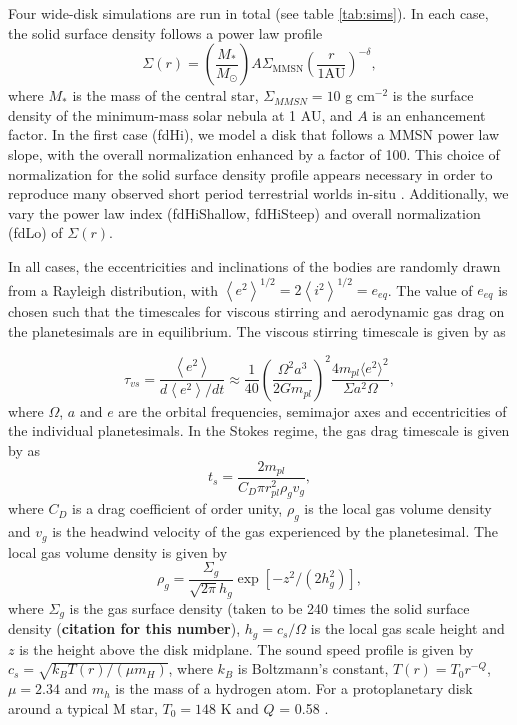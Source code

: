 \documentclass[twocolumn]{aastex63}
\begin{document}
Four wide-disk simulations are run in total (see table \ref{tab:sims}). In each case, the solid surface density follows a power law profile
\begin{equation}
	\Sigma(r) = \left( \frac{M_{*}}{M_{\odot}} \right) A \Sigma_{\mathrm{MMSN}} \left( \frac{r}{1 \mathrm{AU}} \right)^{-\delta},
\end{equation}
where $M_{*}$ is the mass of the central star, $\Sigma_{MMSN} = 10$ g
cm$^{-2}$ is the surface density of the minimum-mass solar nebula
\citep{hayashi81} at 1 AU, and $A$ is an enhancement factor.
In the first case (fdHi), we model a disk that follows a MMSN power law slope, with the overall normalization enhanced by a factor of 100. This choice of normalization for the solid surface density profile appears necessary in order to reproduce many observed short period terrestrial worlds in-situ \citep{hansen12}. Additionally, we vary the power law index (fdHiShallow, fdHiSteep) and overall normalization (fdLo) of $\Sigma(r)$.

In all cases, the eccentricities and inclinations of the bodies are randomly drawn from a Rayleigh distribution, with $\left< e^{2} \right>^{1/2} = 2\left<i^{2} \right>^{1/2} = e_{eq}$. The value of $e_{eq}$ is chosen such that the timescales for viscous stirring and aerodynamic gas drag on the planetesimals are in equilibrium. The viscous stirring timescale is given by \citet{ida93} as

\begin{equation}\label{eq:vs_timescale}
    \tau_{vs}  = \frac{\left< e^2 \right>}{d \left< e^2 \right> / dt} \approx \frac{1}{40}\left(\frac{\Omega^{2} a^{3}}{2 G m_{pl}}\right)^{2} \frac{4 m_{pl} \langle e^{2} \rangle^{2}}{\Sigma a^{2} \Omega},
\end{equation}
where $\Omega$, $a$ and $e$ are the orbital frequencies, semimajor axes and eccentricities of the individual planetesimals. In the Stokes regime, the gas drag timescale is given by \citet{adachi76} as
\begin{equation}\label{eq:ts_stokes}
    t_{s} = \frac{2 m_{pl}}{C_{D} \pi r_{pl}^{2} \rho_{g} v_{g}},
\end{equation}
where $C_{D}$ is a drag coefficient of order unity, $\rho_{g}$ is the local gas volume density and $v_{g}$ is the headwind velocity of the gas experienced by the planetesimal. The local gas volume density is given by
\begin{equation}\label{eq:rho_gas}
	\rho_{g} = \frac{\Sigma_{g}}{\sqrt{2 \pi} h_{g}} \exp\left[ -z^{2} / \left( 2 h_{g}^{2} \right) \right],
\end{equation}
where $\Sigma_{g}$ is the gas surface density (taken to be
240 times the solid surface density ({\bf citation for this number}), $h_{g} = c_{s} / \Omega$ is the local gas scale height and $z$ is the height above the disk midplane. The sound speed profile is given by $c_{s} = \sqrt{k_{B} T(r) / \left( \mu m_{H} \right)}$, where $k_{B}$ is Boltzmann's constant, $T(r) = T_{0} r^{-Q}$, $\mu = 2.34$ and $m_{h}$ is the mass of a hydrogen atom. For a protoplanetary disk around a typical M star, $T_{0} = 148$ K and $Q$ = 0.58 \citep{andrews05}.
\end{document}
